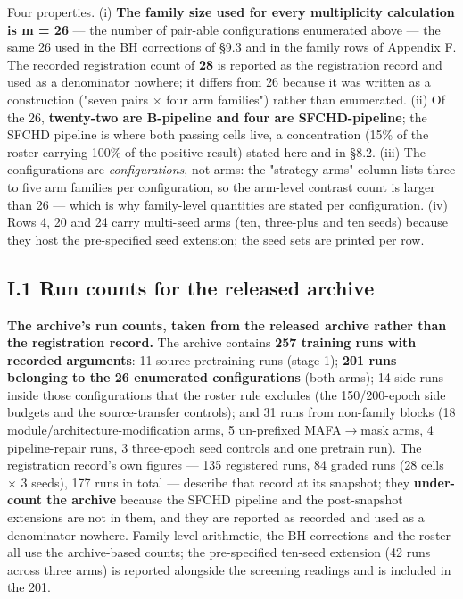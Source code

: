 \documentclass[pdflatex,sn-mathphys-ay]{sn-jnl}
\begin{document}
Four properties. (i) \textbf{The family size used for every multiplicity calculation is m = 26} --- the number of pair-able configurations enumerated above --- the same 26 used in the BH corrections of \S{}9.3 and in the family rows of Appendix F. The recorded registration count of \textbf{28} is reported as the registration record and used as a denominator nowhere; it differs from 26 because it was written as a construction ("seven pairs \ensuremath{\times} four arm families") rather than enumerated. (ii) Of the 26, \textbf{twenty-two are B-pipeline and four are SFCHD-pipeline}; the SFCHD pipeline is where both passing cells live, a concentration (15\% of the roster carrying 100\% of the positive result) stated here and in \S{}8.2. (iii) The configurations are \emph{configurations}, not arms: the "strategy arms" column lists three to five arm families per configuration, so the arm-level contrast count is larger than 26 --- which is why family-level quantities are stated per configuration. (iv) Rows 4, 20 and 24 carry multi-seed arms (ten, three-plus and ten seeds) because they host the pre-specified seed extension; the seed sets are printed per row.

\subsection*{I.1 Run counts for the released archive}

\textbf{The archive's run counts, taken from the released archive rather than the registration record.} The archive contains \textbf{257 training runs with recorded arguments}: 11 source-pretraining runs (stage 1); \textbf{201 runs belonging to the 26 enumerated configurations} (both arms); 14 side-runs inside those configurations that the roster rule excludes (the 150/200-epoch side budgets and the source-transfer controls); and 31 runs from non-family blocks (18 module/architecture-modification arms, 5 un-prefixed MAFA\ensuremath{\rightarrow}mask arms, 4 pipeline-repair runs, 3 three-epoch seed controls and one pretrain run). The registration record's own figures --- 135 registered runs, 84 graded runs (28 cells \ensuremath{\times} 3 seeds), 177 runs in total --- describe that record at its snapshot; they \textbf{under-count the archive} because the SFCHD pipeline and the post-snapshot extensions are not in them, and they are reported as recorded and used as a denominator nowhere. Family-level arithmetic, the BH corrections and the roster all use the archive-based counts; the pre-specified ten-seed extension (42 runs across three arms) is reported alongside the screening readings and is included in the 201.
\end{document}
